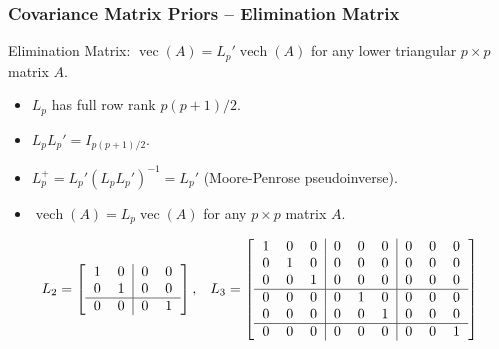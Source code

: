 \documentclass[xcolor=dvipsnames]{beamer}
\DeclareMathOperator{\vech}{vech}
\DeclareMathOperator{\vect}{vec}
\begin{document}
\begin{frame}
\frametitle{Covariance Matrix Priors -- Elimination Matrix}
Elimination Matrix: $\vect(A)=L_p'\vech(A)$ for any lower triangular $p\times p$ matrix $A$.
\begin{itemize}
\item $L_p$ has full row rank $p(p+1)/2$.
\item $L_pL_p'=I_{p(p+1)/2}$.
\item $L_p^{+}=L_p'(L_pL_p')^{-1}=L_p'$ (Moore-Penrose pseudoinverse).
\item $\vech(A)=L_p\vect(A)$ for any $p\times p$ matrix $A$.
\end{itemize}
\pause\begin{align*}
L_2 = \left[\begin{tabular}{cc|cc} 1 & 0 & 0 & 0 \\ 0 & 1 & 0 & 0 \\\hline 0 & 0 & 0 & 1 \end{tabular}\right], && L_3 =  \left[\begin{tabular}{ccc|ccc|ccc}
1 & 0 & 0 & 0 & 0 & 0 & 0 & 0 & 0  \\ 
0 & 1 & 0 & 0 & 0 & 0 & 0 & 0 & 0 \\ 
0 & 0 & 1 & 0 & 0 & 0 & 0 & 0 & 0 \\\hline
0 & 0 & 0 & 0 & 1 & 0 & 0 & 0 & 0 \\
0 & 0 & 0 & 0 & 0 & 1 & 0 & 0 & 0 \\\hline
0 & 0 & 0 & 0 & 0 & 0 & 0 & 0 & 1 \\
\end{tabular}\right]\\~\\
\end{align*}
\end{frame}
\end{document}
